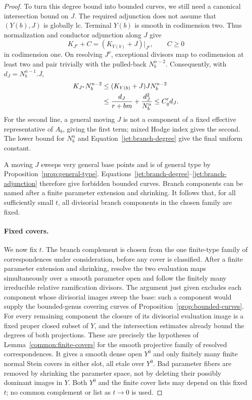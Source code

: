 \begin{proof}
To turn this degree bound into bounded curves, we still need a
canonical intersection bound on \(J\).  The required adjunction
does not assume that \((Y(b),J)\) is globally lc.
Terminal \(Y(b)\) is smooth in codimension
two.  Thus normalization and conductor adjunction along \(J\)
give
\[
 K_{J^\nu}+C=(K_{Y(b)}+J)|_{J^\nu},\qquad C\ge0
\]
in codimension one.  On resolving \(J^\nu\), exceptional divisors
map to codimension at least two and pair trivially with the
pulled-back \(N_b^{n-2}\).  Consequently, with
\(d_J=N_b^{n-1}.J\),
\begin{align}
 K_{J^*}N_b^{n-2}
 &\le (K_{Y(b)}+J)J N_b^{n-2}\notag\\
 &\le \frac{d_J}{r+bm}+\frac{d_J^2}{N_b^n}
 \le C'_q d_J.\label{jet:branch-adjunction}
\end{align}
For the second line, a general moving \(J\) is not a component of
a fixed effective representative of \(A_b\), giving the first
term; mixed Hodge index gives the second.  The lower bound for
\(N_b^n\) and Equation~\eqref{jet:branch-degree} give the final
uniform constant.

A moving \(J\) sweeps very general base points and is of general
type by Proposition~\ref{prop:general-type}.
Equations~\eqref{jet:branch-degree}--\eqref{jet:branch-adjunction}
therefore give forbidden bounded curves.  Branch components can
be named after a finite parameter extension and shrinking.
It follows that, for all sufficiently small \(t\), all divisorial
branch components in the chosen family are fixed.

\paragraph{Fixed covers.}
We now fix $t$. The branch complement is chosen from the one finite-type
family of correspondences under consideration, before any cover is
classified. After a finite parameter extension and shrinking, resolve
the two evaluation maps simultaneously over a smooth parameter open
and follow the finitely many
irreducible relative ramification divisors. The argument just given
excludes each component whose divisorial images sweep the base: such a
component would supply the bounded-genus covering curves of
Proposition~\ref{prop:bounded-curves}. For every remaining component the
closure of its divisorial evaluation image is a fixed proper closed
subset of $Y$, and the intersection estimates already bound the degrees
of both projections. These are precisely the hypotheses of
Lemma~\ref{common:finite-covers} for the smooth projective family of
resolved correspondences. It gives a smooth dense open $Y^0$ and only
finitely many finite normal Stein covers in either slot, all etale over
$Y^0$. Bad parameter fibers are removed by shrinking the parameter space,
not by deleting their possibly dominant images in $Y$. Both $Y^0$ and
the finite cover lists may depend on this fixed $t$; no common complement
or list as $t\to0$ is used.


\end{proof}
